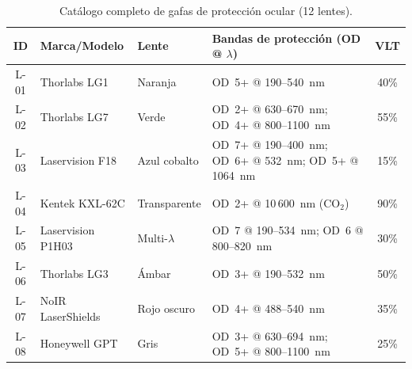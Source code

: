 \documentclass[12pt,a4paper]{article}
\begin{document}
\begin{table}[H]
	\centering
	\caption{Catálogo completo de gafas de protección ocular (12 lentes).}
	\label{tab:epo}
	\small
	\begin{tabularx}{\textwidth}{c l l X c}
		\toprule
		\textbf{ID} & \textbf{Marca/Modelo}                                & \textbf{Lente}
		            & \textbf{Bandas de protección (OD @ $\lambda$)}
		            & \textbf{VLT}                                                           \\
		\midrule
		L-01        & Thorlabs LG1                                         & Naranja
		            & OD~5+ @ 190--540~nm
		            & 40\%                                                                   \\
		L-02        & Thorlabs LG7                                         & Verde
		            & OD~2+ @ 630--670~nm; OD~4+ @ 800--1100~nm
		            & 55\%                                                                   \\
		L-03        & Laservision F18                                      & Azul cobalto
		            & OD~7+ @ 190--400~nm; OD~6+ @ 532~nm; OD~5+ @ 1064~nm
		            & 15\%                                                                   \\
		L-04        & Kentek KXL-62C                                       & Transparente
		            & OD~2+ @ 10\,600~nm (CO$_2$)
		            & 90\%                                                                   \\
		L-05        & Laservision P1H03                                    & Multi-$\lambda$
		            & OD~7 @ 190--534~nm; OD~6 @ 800--820~nm
		            & 30\%                                                                   \\
		L-06        & Thorlabs LG3                                         & Ámbar
		            & OD~3+ @ 190--532~nm
		            & 50\%                                                                   \\
		L-07        & NoIR LaserShields                                    & Rojo oscuro
		            & OD~4+ @ 488--540~nm
		            & 35\%                                                                   \\
		L-08        & Honeywell GPT                                        & Gris
		            & OD~3+ @ 630--694~nm; OD~5+ @ 800--1100~nm
		            & 25\%                                                                   \\

\end{tabularx}
\end{table}
\end{document}
